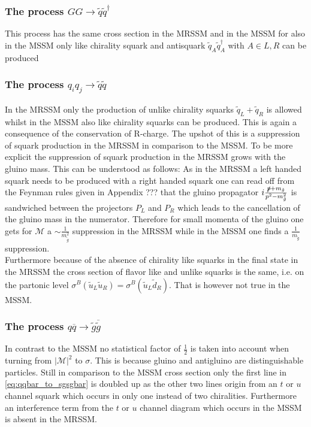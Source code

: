 \subsubsection*{The process $GG \to \tilde{q}\tilde{q}^\dagger$}
This process has the same cross section in the MRSSM and in the MSSM for also in the MSSM only like chirality squark and antisquark $\tilde{q}_A\tilde{q}_A^\dagger$ with $A \in {L,R}$ can be produced

\subsubsection*{The process $q_i q_j \to \tilde{q}\tilde{q}$}
In the MRSSM only the production of unlike chirality squarks $\tilde{q}_L + \tilde{q}_R$ is allowed whilst in the MSSM also like chirality squarks can be produced. This is again a consequence of the conservation of R-charge. The upshot of this is a suppression of squark production in the MRSSM in comparison to the MSSM. To be more explicit the suppression of squark production in the MRSSM grows with the gluino mass. This can be understood as follows: As in the MRSSM a left handed squark needs to be produced with a right handed squark one can read off from the Feynman rules given in Appendix ??? that the gluino propagator $i\frac{\slashed{p}+m_{\tilde{g}}}{p^2-m_{\tilde{g}}^2}$ is sandwiched between the projectors $P_L$ and $P_R$ which leads to the cancellation of the gluino mass in the numerator. Therefore for small momenta of the gluino one gets for $\mathcal{M}$ a $\sim \frac{1}{m_{\tilde{g}}^2}$ suppression in the MRSSM while in the MSSM one finds a $\frac{1}{m_{\tilde{g}}}$ suppression.\\
Furthermore because of the absence of chirality like squarks in the final state in the MRSSM the cross section of flavor like and unlike squarks is the same, i.e. on the partonic level $\sigma^B(\tilde{u}_L\tilde{u}_R) = \sigma^B(\tilde{u}_L\tilde{d}_R)$. That is however not true in the MSSM. 

\subsubsection*{The process $q \overline{q} \to \tilde{g}\overline{\tilde{g}}$}
In contrast to the MSSM no statistical factor of $\frac{1}{2}$ is taken into account when turning from $|\mathcal{M}|^2$ to $\sigma$. This is because gluino and antigluino are distinguishable particles. Still in comparison to the MSSM cross section only the first line in \ref{eq:qqbar_to_sgsgbar} is doubled up as the other two lines origin from an $t$ or $u$ channel squark which occurs in only one instead of two chiralities. Furthermore an interference term from the $t$ or $u$ channel diagram which occurs in the MSSM is absent in the MRSSM.

